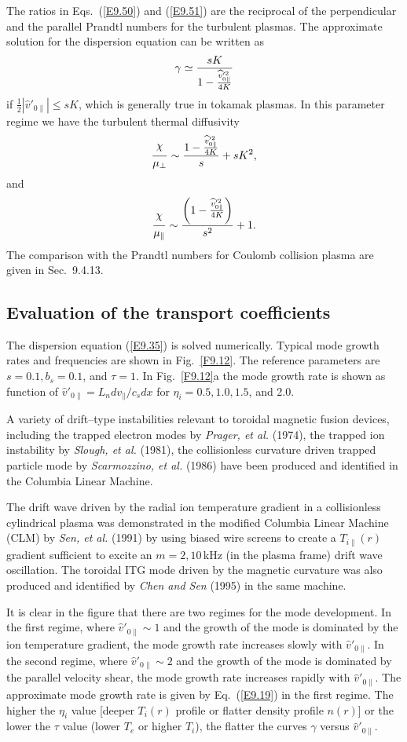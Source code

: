 \documentclass[a4paper,openany,12pt]{book}
\def\chix{\raise.5ex\hbox{$\chi$}}
\begin{document}
{The ratios in Eqs.~(\ref{E9.50}) and (\ref{E9.51}) are the reciprocal of the perpendicular and the parallel Prandtl numbers for the turbulent plasmas. The approximate solution for the dispersion equation can be written as
\begin{equation}
\gamma\simeq{sK\over 1-{\widehat v'^2_{0\|}\over 4K}}\label{E9.52}
\end{equation}
if $\frac{1}{2}|\widehat v'_{0\|}|\le sK$, which is generally true in tokamak plasmas. In this parameter regime we have the turbulent thermal diffusivity
$${\chix\over\mu_\perp}\sim{1-{\widehat v'^2_{0\|}\over 4K}\over s}+sK^2,$$
and
$${\chix\over\mu_\|}\sim{\left(1-{\widehat v'^2_{0\|}\over 4K}\right)\over s^2}+1.$$
The comparison with the Prandtl numbers for Coulomb collision plasma are given in Sec.~9.4.13.

\subsection{Evaluation of the transport coefficients}

The dispersion equation (\ref{E9.35}) is solved numerically. Typical mode growth rates and frequencies are shown in Fig.~\ref{F9.12}. The reference parameters are $s=0.1, b_s=0.1$, and $\tau=1$. In Fig.~\ref{F9.12}a the mode growth rate is shown as function of $\widehat v'_{0\|}=L_n dv_\|/c_sdx$ for $\eta_i=0.5,1.0,1.5$, and 2.0. 

A variety of drift--type instabilities relevant to toroidal magnetic fusion devices, including the trapped electron modes by \emph{Prager, et al.} (1974), the trapped ion instability by \emph{Slough, et al.} (1981), the collisionless curvature driven trapped particle mode by \emph{Scarmozzino, et al.} (1986) have been produced and identified in the Columbia Linear Machine.

The drift wave driven by the radial ion temperature gradient in a collisionless cylindrical plasma was demonstrated in the modified Columbia Linear Machine (CLM) by \emph{Sen, et al.} (1991) by using biased wire screens to create a $T_{i\|}(r)$ gradient sufficient to excite an $m=2,10\,$kHz (in the plasma frame) drift wave oscillation. The toroidal ITG mode driven by the magnetic curvature was also produced and identified by \emph{Chen and Sen} (1995) in the same machine.

It is clear in the figure that there are two regimes for the mode development. In the first regime, where $\widehat v'_{0\|}\sim 1$ and the growth of the mode is dominated by the ion temperature gradient, the mode growth rate increases slowly with $\widehat v'_{0\|}$. In the second regime, where $\widehat v'_{0\|}\sim 2$ and the growth of the mode is dominated by the parallel velocity shear, the mode growth rate increases rapidly with  $\widehat v'_{0\|}$. The approximate mode growth rate is given by Eq.~(\ref{E9.19}) in the first regime. The higher the $\eta_i$ value [deeper $T_i(r)$ profile or flatter density profile $n(r)$] or the lower the $\tau$ value (lower $T_e$ or higher $T_i$), the flatter the curves $\gamma$ versus $\widehat v'_{0\|}$.
%

}
\end{document}
